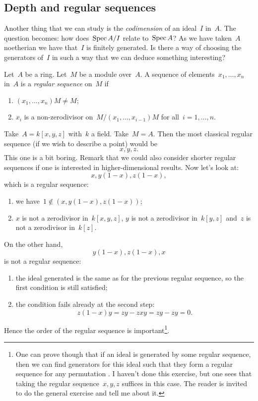 \documentclass[10pt,a4paper]{article}
\begin{document}
\subsection{Depth and regular sequences}
Another thing that we can study is the \emph{codimension} of an ideal~$I$ in~$A$. The question becomes: how does~$\operatorname{Spec} A/I$ relate to~$\operatorname{Spec} A$? As we have taken~$A$ noetherian we have that~$I$ is finitely generated. Is there a way of choosing the generators of~$I$ in such a way that we can deduce something interesting?
\begin{definition}
  Let~$A$ be a ring. Let~$M$ be a module over~$A$. A sequence of elements~$x_1,\dotsc,x_n$ in~$A$ is a \emph{regular sequence} on~$M$ if
  \begin{enumerate}
    \item $(x_1,\dotsc,x_n)M\neq M$;
    \item $x_i$ is a non-zerodivisor on~$M/(x_1,\dotsc,x_{i-1})M$ for all~$i=1,\dotsc,n$.
  \end{enumerate}
\end{definition}
\begin{example}
  Take~$A=k[x,y,z]$ with~$k$ a field. Take~$M=A$. Then the most classical regular sequence (if we wish to describe a point) would be
  \begin{equation}
    x,y,z.
  \end{equation}
  This one is a bit boring. Remark that we could also consider shorter regular sequences if one is interested in higher-dimensional results. Now let's look at:
  \begin{equation}
    x,y(1-x),z(1-x),
  \end{equation}
  which is a regular sequence:
  \begin{enumerate}
    \item we have~$1\notin(x,y(1-x),z(1-x))$;
    \item $x$ is not a zerodivisor in~$k[x,y,z]$, $y$ is not a zerodivisor in~$k[y,z]$ and~$z$ is not a zerodivisor in~$k[z]$.
  \end{enumerate}
  On the other hand,
  \begin{equation}
    y(1-x),z(1-x),x
  \end{equation}
  is not a regular sequence:
  \begin{enumerate}
    \item the ideal generated is the same as for the previous regular sequence, so the first condition is still satisfied;
    \item the condition fails already at the second step:
      \begin{equation}
        z(1-x)y=zy-zxy=zy-zy=0.
      \end{equation}
  \end{enumerate}
  Hence the order of the regular sequence is important\footnote{One can prove though that if an ideal is generated by some regular sequence, then we can find generators for this ideal such that they form a regular sequence for any permutation \cite[exercise 17.6]{eisenbud-commutative-algebra}. I haven't done this exercise, but one sees that taking the regular sequence~$x,y,z$ suffices in this case. The reader is invited to do the general exercise and tell me about it.}.
\end{example}
\end{document}
